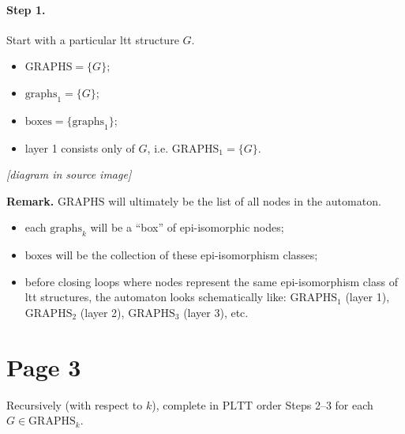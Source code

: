 \documentclass[11pt]{article}
\theoremstyle{definition}
\begin{document}
\paragraph{Step 1.}
Start with a particular ltt structure $G$.
\begin{itemize}
  \item $\mathrm{GRAPHS}=\{G\}$;
  \item $\mathrm{graphs}_1=\{G\}$;
  \item $\mathrm{boxes}=\{\mathrm{graphs}_1\}$;
  \item layer 1 consists only of $G$, i.e. $\mathrm{GRAPHS}_1=\{G\}$.
\end{itemize}

\noindent\emph{[diagram in source image]}

\medskip
\noindent\textbf{Remark.}
$\mathrm{GRAPHS}$ will ultimately be the list of all nodes in the automaton.
\begin{itemize}
  \item each $\mathrm{graphs}_k$ will be a ``box'' of epi-isomorphic nodes;
  \item $\mathrm{boxes}$ will be the collection of these epi-isomorphism classes;
  \item before closing loops where nodes represent the same epi-isomorphism class of
        ltt structures, the automaton looks schematically like:
        $\mathrm{GRAPHS}_1$ (layer 1), $\mathrm{GRAPHS}_2$ (layer 2),
        $\mathrm{GRAPHS}_3$ (layer 3), etc.
\end{itemize}

\section*{Page 3}

Recursively (with respect to $k$), complete in $\mathrm{PLTT}$ order Steps 2--3
for each $G\in \mathrm{GRAPHS}_k$.
\end{document}

